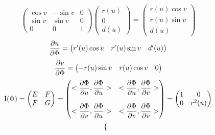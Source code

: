 \documentclass[main]{sub\Phiiles}
\begin{document}
    \begin{Sol}
        \[\begin{pmatrix}
            \cos v & -\sin v & 0\\
            \sin v & \sin v & 0\\
            0 & 0 & 1
        \end{pmatrix} \begin{pmatrix}
            r(u)\\
            0\\
            d(u)
        \end{pmatrix} = \begin{pmatrix}
            r(u) \cos v\\
            r(u) \sin v\\
            d(u)
        \end{pmatrix}\]
        \[\dfrac{\partial u}{\partial \Phi} = \begin{pmatrix}
            r'(u) \cos v & r'(u) \sin v & d'(u)
        \end{pmatrix}\]
        \[\dfrac{\partial v}{\partial \Phi} = \begin{pmatrix}
            -r(u) \sin v & r(u) \cos v & 0
        \end{pmatrix}\]
        \[\RNumb{1}(\Phi) = \begin{pmatrix}
            E & F\\
            F & G
        \end{pmatrix}= \begin{pmatrix}
          <\dfrac{\d \Phi}{\d u}, \dfrac{\d \Phi}{\d u}> & <\dfrac{\d \Phi}{\d u}, \dfrac{\d \Phi}{\d v}>\\
          \\
          <\dfrac{\d \Phi}{\d v}, \dfrac{\d \Phi}{\d u}> & <\dfrac{\d \Phi}{\d v}, \dfrac{\d \Phi}{\d v}>
        \end{pmatrix} = \begin{pmatrix}
            1 & 0\\
            0 & r^2(u)
        \end{pmatrix}\]
        \[\begin{cases}

\end{cases}\]
\end{Sol}
\end{document}
